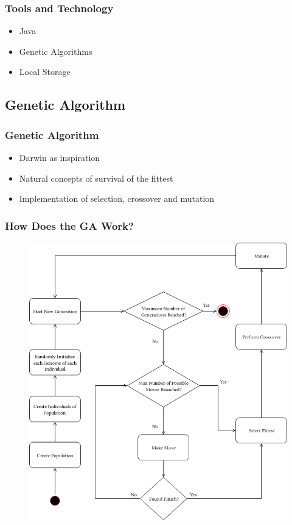 \documentclass{beamer}
\begin{document}
\begin{frame}
    \frametitle{Tools and Technology}
   \large
    \begin{itemize}
        \item Java 
        \item Genetic Algorithms
        \item Local Storage
    \end{itemize}

\end{frame}


\subsection{Genetic Algorithm}
\begin{frame}
    \frametitle{Genetic Algorithm}

    \begin{itemize}
        \item Darwin as inspiration
        \item Natural concepts of survival of the fittest
        \item Implementation of selection, crossover and mutation
    \end{itemize}

\end{frame}

\begin{frame}
    \frametitle{How Does the GA Work?}
    \begin{figure}
        \includegraphics[scale=0.3]{resources/GeneticAlgorithm.png}

    \end{figure}

\end{frame}
\end{document}
